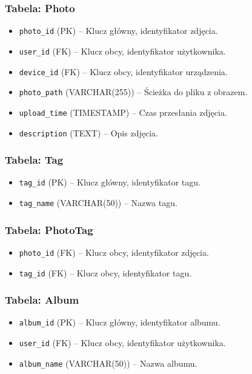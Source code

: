 \documentclass[12pt,a4paper]{article}
\begin{document}
\subsubsection{Tabela: Photo}
\begin{itemize}
    \item \texttt{photo\_id} (PK) -- Klucz główny, identyfikator zdjęcia.
    \item \texttt{user\_id} (FK) -- Klucz obcy, identyfikator użytkownika.
    \item \texttt{device\_id} (FK) -- Klucz obcy, identyfikator urządzenia.
    \item \texttt{photo\_path} (VARCHAR(255)) -- Ścieżka do pliku z obrazem.
    \item \texttt{upload\_time} (TIMESTAMP) -- Czas przesłania zdjęcia.
    \item \texttt{description} (TEXT) -- Opis zdjęcia.
\end{itemize}

\subsubsection{Tabela: Tag}
\begin{itemize}
    \item \texttt{tag\_id} (PK) -- Klucz główny, identyfikator tagu.
    \item \texttt{tag\_name} (VARCHAR(50)) -- Nazwa tagu.
\end{itemize}

\subsubsection{Tabela: PhotoTag}
\begin{itemize}
    \item \texttt{photo\_id} (FK) -- Klucz obcy, identyfikator zdjęcia.
    \item \texttt{tag\_id} (FK) -- Klucz obcy, identyfikator tagu.
\end{itemize}

\subsubsection{Tabela: Album}
\begin{itemize}
    \item \texttt{album\_id} (PK) -- Klucz główny, identyfikator albumu.
    \item \texttt{user\_id} (FK) -- Klucz obcy, identyfikator użytkownika.
    \item \texttt{album\_name} (VARCHAR(50)) -- Nazwa albumu.
\end{itemize}
\end{document}
